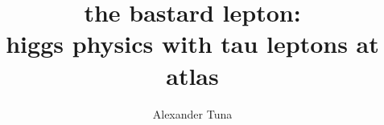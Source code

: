 \title{the bastard lepton:\\ higgs physics with tau leptons at atlas}
    
\author{Alexander Tuna}

\newcommand{\adviser}{H.H. Williams, Professor, Physics}
\newcommand{\advisershort}{H.H. Williams}
\newcommand{\myinstitution}{The University of Pennsylvania}
\newcommand{\chairperson}{Marija Drndic, Professor, Physics}

\newcommand{\committeeOne}{Randall Kamien, Professor, Physics}
\newcommand{\committeeTwo}{I. Joseph Kroll, Professor, Physics}
\newcommand{\committeeThree}{Elliot Lipeles, Assistant Professor, Physics}
\newcommand{\committeeFour}{Burt Ovrut, Professor, Physics}



